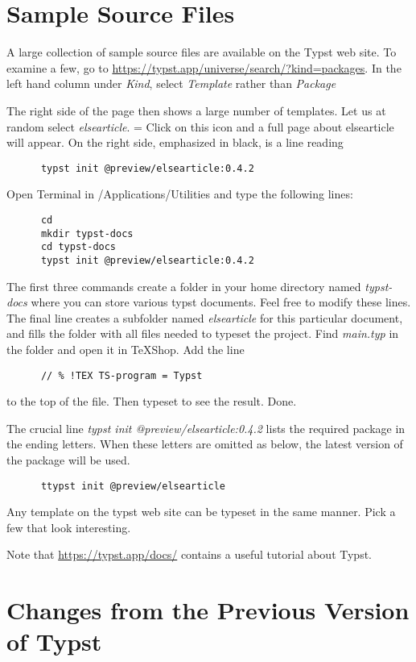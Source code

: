 \documentclass[11pt, oneside]{article}   	%
\begin{document}
\newpage
\section{Sample Source Files}

A large collection of sample source files are available on the Typst web site. To examine a few, go to
 \url{https://typst.app/universe/search/?kind=packages}. In the left hand column under {\em Kind}, select {\em Template} rather than {\em Package}
 
 The right side of the page then shows a large number of templates. Let us at random select {\em elsearticle}.
= Click on this icon and a full page about elsearticle will appear. On the right side, emphasized in black,
 is a line reading
 \begin{verbatim}
      typst init @preview/elsearticle:0.4.2
\end{verbatim}
Open Terminal in /Applications/Utilities and type the following lines:
\begin{verbatim}
      cd
      mkdir typst-docs
      cd typst-docs
      typst init @preview/elsearticle:0.4.2
\end{verbatim}
The first three commands create a folder in your home directory named {\em typst-docs} where you can store
 various typst documents. Feel free to modify these lines. The final line  creates a subfolder named {\em elsearticle} for
 this particular document, and fills the folder with all files needed to typeset the project. Find {\em main.typ}
 in the folder and open it in TeXShop.  Add the line
 \begin{verbatim}
      // % !TEX TS-program = Typst
\end{verbatim}
to the top of the file. Then typeset to see the result. Done.

The crucial line {\em  typst init @preview/elsearticle:0.4.2} lists the required package in the ending letters.
When these letters are omitted as below, the latest version of the package will be used.
\begin{verbatim}
      ttypst init @preview/elsearticle
\end{verbatim}
Any template on the typst web site can be typeset in the same manner. Pick a few that look interesting.

Note that \url{https://typst.app/docs/} contains a useful tutorial about Typst. 

\section{Changes from the Previous Version of Typst}
\end{document}
